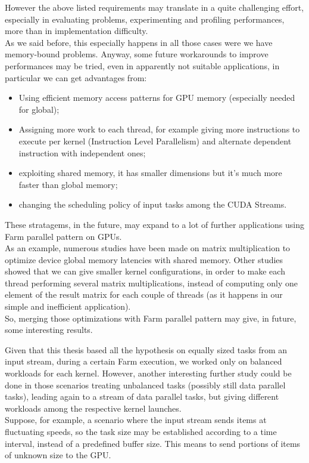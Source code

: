 However the above listed requirements may translate in a quite challenging effort, especially in evaluating problems, experimenting and profiling performances, more than in implementation difficulty.\\
As we said before, this especially happens in all those cases were we have memory-bound problems. Anyway, some future workarounds to improve performances may be tried, even in apparently not suitable applications, in particular we can get advantages from:
\begin{itemize}
	\item Using efficient memory access patterns for GPU memory (especially needed for global);
	\item Assigning more work to each thread, for example giving more instructions to execute per kernel (Instruction Level Parallelism) and alternate dependent instruction with independent ones\cite{cudabestpractices,loweroccupancy};
	\item exploiting shared memory, it has smaller dimensions but it's much more faster than global memory\cite{cudaguide};
	\item changing the scheduling policy of input tasks among the CUDA Streams.
\end{itemize} 
These stratagems, in the future, may expand to a lot of further applications using Farm parallel pattern on GPUs.\\
As an example, numerous studies have been made on matrix multiplication to optimize device global memory latencies with shared memory\cite{cudaguide,matmul}.
Other studies showed that we can give smaller kernel configurations, in order to make each thread performing several matrix multiplications\cite{loweroccupancy,matmul}, instead of computing only one element of the result matrix for each couple of threads (as it happens in our simple and inefficient application).\\
So, merging those optimizations with Farm parallel pattern may give, in future, some interesting results.


 Given that this thesis based all the hypothesis on equally sized tasks  from an input stream, during a certain Farm execution, we worked only on balanced workloads for each kernel.
 However, another interesting further study could be done in those scenarios treating unbalanced tasks (possibly still data parallel tasks), leading again to a stream of data parallel tasks, but giving different workloads among the respective kernel launches.\\
 Suppose, for example, a scenario where the input stream sends items at fluctuating speeds, so the task size may be established according to a time interval, instead of a predefined buffer size. This means to send portions of items of unknown size to the GPU.\\
 
